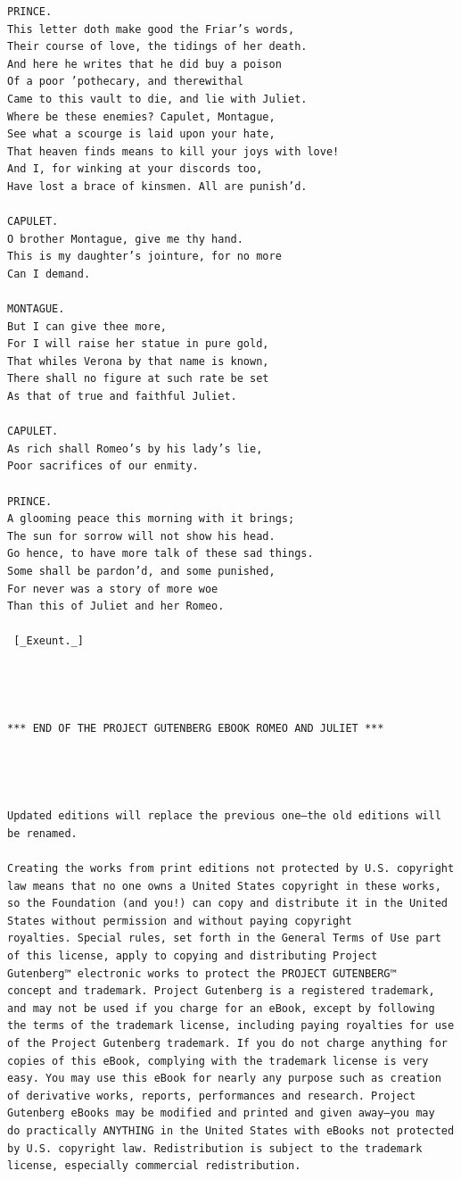 \documentclass{article}
\begin{document}
\begin{verbatim}
PRINCE.
This letter doth make good the Friar’s words,
Their course of love, the tidings of her death.
And here he writes that he did buy a poison
Of a poor ’pothecary, and therewithal
Came to this vault to die, and lie with Juliet.
Where be these enemies? Capulet, Montague,
See what a scourge is laid upon your hate,
That heaven finds means to kill your joys with love!
And I, for winking at your discords too,
Have lost a brace of kinsmen. All are punish’d.

CAPULET.
O brother Montague, give me thy hand.
This is my daughter’s jointure, for no more
Can I demand.

MONTAGUE.
But I can give thee more,
For I will raise her statue in pure gold,
That whiles Verona by that name is known,
There shall no figure at such rate be set
As that of true and faithful Juliet.

CAPULET.
As rich shall Romeo’s by his lady’s lie,
Poor sacrifices of our enmity.

PRINCE.
A glooming peace this morning with it brings;
The sun for sorrow will not show his head.
Go hence, to have more talk of these sad things.
Some shall be pardon’d, and some punished,
For never was a story of more woe
Than this of Juliet and her Romeo.

 [_Exeunt._]




*** END OF THE PROJECT GUTENBERG EBOOK ROMEO AND JULIET ***




Updated editions will replace the previous one—the old editions will
be renamed.

Creating the works from print editions not protected by U.S. copyright
law means that no one owns a United States copyright in these works,
so the Foundation (and you!) can copy and distribute it in the United
States without permission and without paying copyright
royalties. Special rules, set forth in the General Terms of Use part
of this license, apply to copying and distributing Project
Gutenberg™ electronic works to protect the PROJECT GUTENBERG™
concept and trademark. Project Gutenberg is a registered trademark,
and may not be used if you charge for an eBook, except by following
the terms of the trademark license, including paying royalties for use
of the Project Gutenberg trademark. If you do not charge anything for
copies of this eBook, complying with the trademark license is very
easy. You may use this eBook for nearly any purpose such as creation
of derivative works, reports, performances and research. Project
Gutenberg eBooks may be modified and printed and given away—you may
do practically ANYTHING in the United States with eBooks not protected
by U.S. copyright law. Redistribution is subject to the trademark
license, especially commercial redistribution.



\end{verbatim}
\end{document}

